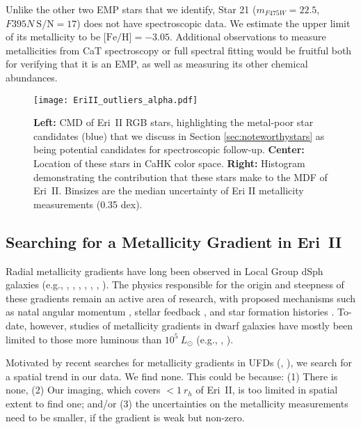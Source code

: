 \documentclass[twocolumn]{aastex63}
\begin{document}
\par Unlike the other two EMP stars that we identify, Star 21 ($m_{F475W}=22.5$, $F395N~\mbox{S/N}=17$) does not have spectroscopic data. We estimate the upper limit of its metallicity to be $\mbox{[Fe/H]}=-3.05$. Additional observations to measure metallicities from CaT spectroscopy or full spectral fitting would be fruitful both for verifying that it is an EMP, as well as measuring its other chemical abundances. 

\begin{figure*}
    \centering
    \texttt{[image: EriII\_outliers\_alpha.pdf]}
    \caption{\textbf{Left:} CMD of Eri~II RGB stars, highlighting the metal-poor star candidates (blue) that we discuss in Section \ref{sec:noteworthystars} as being potential candidates for spectroscopic follow-up. \textbf{Center:} Location of these stars in CaHK color space. \textbf{Right:} Histogram demonstrating the contribution that these stars make to the MDF of Eri~II. Binsizes are the median uncertainty of Eri II metallicity measurements (0.35 dex).}
    \label{fig:eriII_outliers}
\end{figure*}

\subsection{Searching for a Metallicity Gradient in Eri~II}


\par Radial metallicity gradients have long been observed in Local Group dSph galaxies (e.g., \citealt{held1999}, \citealt{saviane2000}, \citealt{saviane2001}, \citealt{harbeck2001}, \citealt{tolstoy2004}, \citealt{deboer2012}, \citealt{kacharov2017}). The physics responsible for the origin and steepness of these gradients remain an active area of research, with proposed mechanisms such as natal angular momentum \citep[e.g., ][]{schroyen2011}, stellar feedback \citep[e.g., ][]{elbadry2016}, and star formation histories \citep[e.g., ][]{mercado2021gradients}.  To-date, however, studies of metallicity gradients in dwarf galaxies have mostly been limited to those more luminous than $10^5~L_{\odot}$ (e.g., \citealt{vargas2014}, \citealt{ho2015}).

\par Motivated by recent searches for metallicity gradients in UFDs (\citealt{chiti2021tucII}, \citealt{longeard2021booI}), we search for a spatial trend in our data. We find none. This could be because: (1) There is none, (2) Our imaging, which covers $<1~r_h$ of Eri~II, is too limited in spatial extent to find one; and/or (3) the uncertainties on the metallicity measurements need to be smaller, if the gradient is weak but non-zero. 
\end{document}
